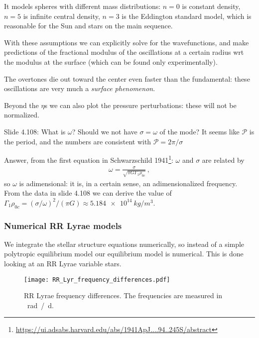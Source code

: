 \documentclass[main.tex]{subfiles}
\begin{document}
It models spheres with different mass distributions:
\(n=0\) is constant density, \(n=5\) is infinite central density, \(n=3\) is the Eddington standard model, which is reasonable for the Sun and stars on the main sequence.

With these assumptions we can explicitly solve for the wavefunctions, and make predictions of the fractional modulus of the oscillations at a certain radius wrt the modulus at the surface (which can be found only experimentally).

The overtones die out toward the center even faster than the fundamental: these oscillations are very much a \emph{surface phenomenon}.

Beyond the \(\eta\)s we can also plot the pressure perturbations: these will not be normalized.

\begin{bluebox}
Slide 4.108: What is \(\omega \)? Should we not have \(\sigma = \omega \) of the mode? It seems like \(\mathcal{P}\) is the period, and the numbers are consistent with \(\mathcal{P} = 2 \pi / \sigma \)

Answer, from the first equation in Schwarzschild 1941\footnote{\url{https://ui.adsabs.harvard.edu/abs/1941ApJ....94..245S/abstract}}: \(\omega \) and \(\sigma \) are related by 
%
\begin{align}
  \omega = \frac{\sigma}{\sqrt{\pi G \Gamma_1 \rho_{0c}}}
  \,,
\end{align}
%
so \(\omega \) is adimensional: it is, in a certain sense, an adimensionalized frequency. From the data in slide 4.108 we can derive the value of \(\Gamma_1 \rho_{0c} = (\sigma / \omega )^2 / (\pi G) \approx \SI{5.184e14}{kg/m^3}\).
\end{bluebox}

\subsubsection{Numerical RR Lyrae models}

We integrate the stellar structure equations numerically, so instead of a simple polytropic equilibrium model our equilibrium model is numerical. 
This is done looking at an RR Lyrae variable stars.

\begin{figure}[ht]
\centering
\texttt{[image: RR\_Lyr\_frequency\_differences.pdf]}
\caption{RR Lyrae frequency differences. The frequencies are measured in \SI{}{rad / d}.}
\label{fig:RR_Lyr_frequency_differences}
\end{figure}
\end{document}
